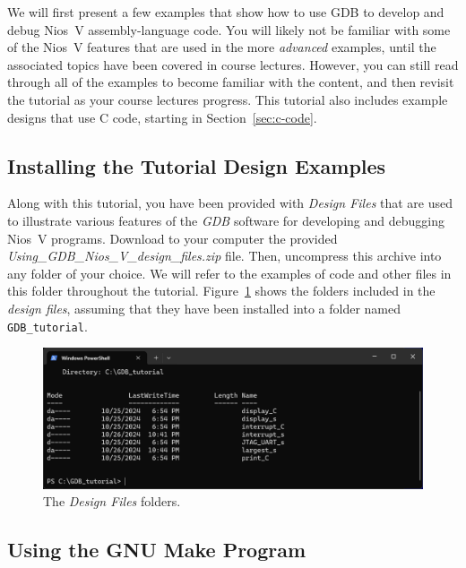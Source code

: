 \documentclass[11pt, twoside, pdftex]{article}
\begin{document}
We will first present a few examples that show how to use GDB to develop and debug Nios~V 
assembly-language code. You will likely not be familiar with some of the Nios~V features that are
used in the more {\it advanced} examples, until the associated topics have been covered in
course lectures. However, you can still read through all of the examples to become
familiar with the content, and then revisit the tutorial as your course lectures progress.
This tutorial also includes example designs that use C code, starting in 
Section~\ref{sec:c-code}.

\subsection{Installing the Tutorial Design Examples}
\label{sec:egs}

Along with this tutorial, you have been provided with {\it Design Files} that are used to 
illustrate various features of the {\it GDB} software for developing and debugging Nios~V 
programs. Download to your computer the provided {\it Using\_GDB\_Nios\_V\_design\_files.zip}
file. Then, uncompress this archive into any folder of your choice. We will refer to the 
examples of code and other files in this folder throughout the tutorial. 
Figure~\ref{fig:designfiles} shows the folders included in the {\it design files}, assuming 
that they have been installed into a folder named \texttt{GDB\_tutorial}.

\begin{figure}[h]
    \begin{center}
        \includegraphics[width=.9\linewidth]{figures/designfiles.png}
        \caption{The {\it Design Files} folders.}
        \label{fig:designfiles}
    \end{center}
\end{figure}

\subsection{Using the GNU Make Program}
\end{document}
